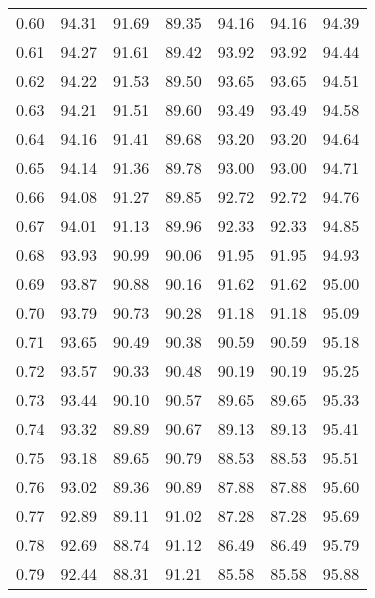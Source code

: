\begin{tabular}{|c|c|c|c|c|c|c|}
      0.60 &     94.31 &     91.69 &      89.35 &   94.16 &      94.16 &         94.39 \\
      0.61 &     94.27 &     91.61 &      89.42 &   93.92 &      93.92 &         94.44 \\
      0.62 &     94.22 &     91.53 &      89.50 &   93.65 &      93.65 &         94.51 \\
      0.63 &     94.21 &     91.51 &      89.60 &   93.49 &      93.49 &         94.58 \\
      0.64 &     94.16 &     91.41 &      89.68 &   93.20 &      93.20 &         94.64 \\
      0.65 &     94.14 &     91.36 &      89.78 &   93.00 &      93.00 &         94.71 \\
      0.66 &     94.08 &     91.27 &      89.85 &   92.72 &      92.72 &         94.76 \\
      0.67 &     94.01 &     91.13 &      89.96 &   92.33 &      92.33 &         94.85 \\
      0.68 &     93.93 &     90.99 &      90.06 &   91.95 &      91.95 &         94.93 \\
      0.69 &     93.87 &     90.88 &      90.16 &   91.62 &      91.62 &         95.00 \\
      0.70 &     93.79 &     90.73 &      90.28 &   91.18 &      91.18 &         95.09 \\
      0.71 &     93.65 &     90.49 &      90.38 &   90.59 &      90.59 &         95.18 \\
      0.72 &     93.57 &     90.33 &      90.48 &   90.19 &      90.19 &         95.25 \\
      0.73 &     93.44 &     90.10 &      90.57 &   89.65 &      89.65 &         95.33 \\
      0.74 &     93.32 &     89.89 &      90.67 &   89.13 &      89.13 &         95.41 \\
      0.75 &     93.18 &     89.65 &      90.79 &   88.53 &      88.53 &         95.51 \\
      0.76 &     93.02 &     89.36 &      90.89 &   87.88 &      87.88 &         95.60 \\
      0.77 &     92.89 &     89.11 &      91.02 &   87.28 &      87.28 &         95.69 \\
      0.78 &     92.69 &     88.74 &      91.12 &   86.49 &      86.49 &         95.79 \\
      0.79 &     92.44 &     88.31 &      91.21 &   85.58 &      85.58 &         95.88 \\

\end{tabular}
